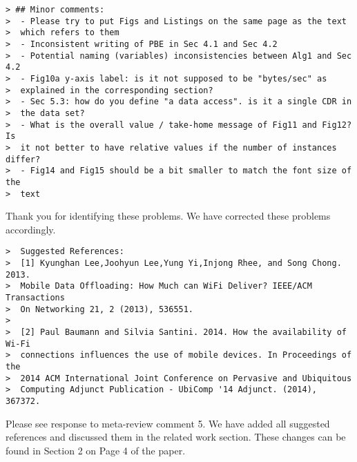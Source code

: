 \begin{verbatim}
> ## Minor comments:
>  - Please try to put Figs and Listings on the same page as the text
>  which refers to them
>  - Inconsistent writing of PBE in Sec 4.1 and Sec 4.2
>  - Potential naming (variables) inconsistencies between Alg1 and Sec 4.2
>  - Fig10a y-axis label: is it not supposed to be "bytes/sec" as
>  explained in the corresponding section?
>  - Sec 5.3: how do you define "a data access". is it a single CDR in
>  the data set?
>  - What is the overall value / take-home message of Fig11 and Fig12? Is
>  it not better to have relative values if the number of instances differ?
>  - Fig14 and Fig15 should be a bit smaller to match the font size of the
>  text
\end{verbatim}

Thank you for identifying these problems. 
We have corrected these problems accordingly. 

\begin{verbatim}
>  Suggested References:
>  [1] Kyunghan Lee,Joohyun Lee,Yung Yi,Injong Rhee, and Song Chong. 2013.
>  Mobile Data Offloading: How Much can WiFi Deliver? IEEE/ACM Transactions
>  On Networking 21, 2 (2013), 536551.
>
>  [2] Paul Baumann and Silvia Santini. 2014. How the availability of Wi-Fi
>  connections influences the use of mobile devices. In Proceedings of the
>  2014 ACM International Joint Conference on Pervasive and Ubiquitous
>  Computing Adjunct Publication - UbiComp '14 Adjunct. (2014), 367372.
\end{verbatim}

Please see response to meta-review comment 5. We have added all suggested references and discussed them in the related work section.  These changes can be found in Section 2 on Page 4 of the paper.
